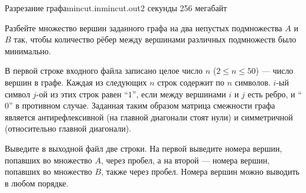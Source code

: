 \begin{problem}{Разрезание графа}{mincut.in}{mincut.out}{2 секунды}
{256 мегабайт}

Разбейте множество вершин заданного графа на два непустых подмножества
$A$ и $B$ так, чтобы количество рёбер между вершинами различных
подмножеств было минимально.


\InputFile
В первой строке входного файла записано целое число $n$
($2 \leqslant n \leqslant 50$) --- число вершин в графе.
Каждая из следующих $n$ строк содержит по $n$ символов.
$i$-ый символ $j$-ой из этих строк равен ``$1$'', если между вершинами
$i$ и $j$ есть ребро, и ``$0$'' в противном случае. Заданная таким
образом матрица смежности графа является антирефлексивной (на главной
диагонали стоят нули) и симметричной (относительно главной диагонали).


\OutputFile
Выведите в выходной файл две строки. На первой выведите номера вершин,
попавших во множество $A$, через пробел, а на второй --- номера вершин,
попавших во множество $B$, также через пробел. Номера вершин можно выводить
в любом порядке.


\Examples

\begin{example}
%
\end{example}

\end{problem}

